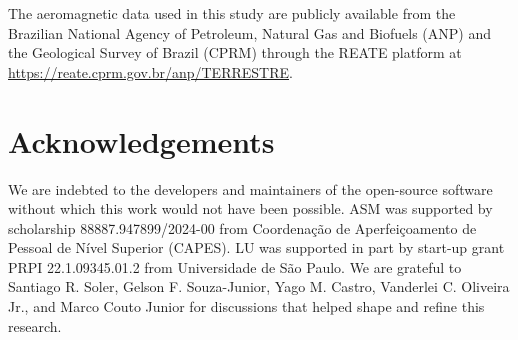 \documentclass[onecolumn,10pt,a4paper]{article}
\begin{document}
The aeromagnetic data used in this study are publicly available from the
Brazilian National Agency of Petroleum, Natural Gas and Biofuels (ANP) and the
Geological Survey of Brazil (CPRM) through the REATE platform at
\url{https://reate.cprm.gov.br/anp/TERRESTRE}.


\section*{Acknowledgements}

We are indebted to the developers and maintainers of the open-source software
without which this work would not have been possible.
ASM was supported by scholarship 88887.947899/2024-00 from Coordenação de
Aperfeiçoamento de Pessoal de Nível Superior (CAPES).
LU was supported in part by start-up grant PRPI 22.1.09345.01.2 from
Universidade de São Paulo.
We are grateful to Santiago R. Soler, Gelson F. Souza-Junior, Yago M. Castro,
Vanderlei C. Oliveira Jr., and Marco Couto Junior for discussions that helped
shape and refine this research.




\end{document}
